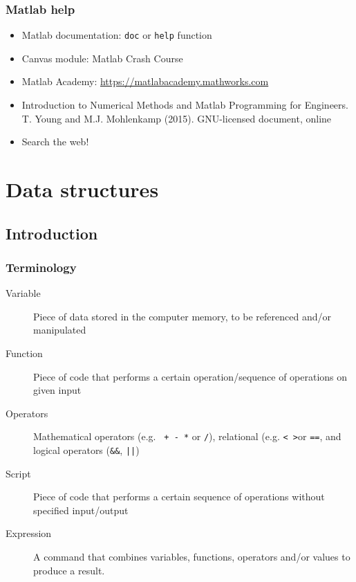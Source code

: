 \begin{frame}
\frametitle{Matlab help}
\begin{itemize}[<+->]
  \item Matlab documentation: \lstinline$doc$ or \lstinline$help$ function
  \item Canvas module: Matlab Crash Course
  \item Matlab Academy: \url{https://matlabacademy.mathworks.com}
  \item Introduction to Numerical Methods and Matlab Programming for Engineers. T. Young and M.J. Mohlenkamp (2015). GNU-licensed document, online
  \item Search the web!
\end{itemize}
\vspace{-2em}
\flushright{}
\end{frame}
%
\section{Data structures}
\subsection*{Introduction}
\begin{frame}
 \frametitle{Terminology}
 \begin{description}
  \item[Variable] Piece of data stored in the computer memory, to be referenced and/or manipulated
  \item[Function] Piece of code that performs a certain operation/sequence of operations on given input
  \item[Operators] Mathematical operators (e.g. \lstinline$ + - *$ or \lstinline$/$), relational (e.g. \lstinline$< >$or \lstinline$==$, and logical operators (\lstinline$&&$, \lstinline$||$)
  \item[Script] Piece of code that performs a certain sequence of operations without specified input/output
  \item[Expression] A command that combines variables, functions, operators and/or values to produce a result.
 \end{description}
\end{frame}

